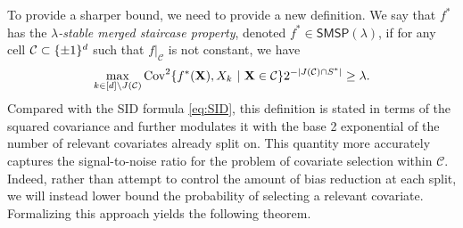 \documentclass[11pt]{article}
\newcommand{\bX}{\mathbf{X}}
\DeclarePairedDelimiter{\braces}{\lbrace}{\rbrace}
\newcommand{\Cov}{\operatorname{Cov}}
\newcommand{\cell}{\mathcal{C}}
\newcommand{\binspace}{\braces{\pm 1}^\nfeats}
\newcommand{\nfeats}{d}
\newcommand{\nsamples}{n}
\newcommand{\coordindices}{[\nfeats]}
\newcommand{\data}[1][n]{\mathcal{D}_{#1}}
\newcommand{\cellfeatindices}{J}
\newcommand{\SID}{\textsf{SID}}
\newcommand{\suppset}{S^*}
\newcommand{\stabmsp}{\textsf{SMSP}}
\begin{document}

To provide a sharper bound, we need to provide a new definition.
We say that $f^*$ has the \emph{$\lambda$-stable merged staircase property}, denoted $f^* \in \stabmsp(\lambda)$, if for any cell $\cell \subset \binspace$ such that $f|_\cell$ is not constant, we have
\begin{equation} \label{eq:stab_msp}
    \max_{k \in \coordindices\backslash \cellfeatindices(\cell)}\Cov^2\braces*{f^*(\bX),X_k~|~\bX \in \cell}2^{-|\cellfeatindices(\cell)\cap \suppset|} \geq \lambda.
\end{equation}
Compared with the SID formula \eqref{eq:SID}, this definition is stated in terms of the squared covariance and further modulates it with the base 2 exponential of the number of relevant covariates already split on.
This quantity more accurately captures the signal-to-noise ratio for the problem of covariate selection within $\cell$.
Indeed, rather than attempt to control the amount of bias reduction at each split, we will instead lower bound the probability of selecting a relevant covariate.
Formalizing this approach yields the following theorem.

\end{document}
